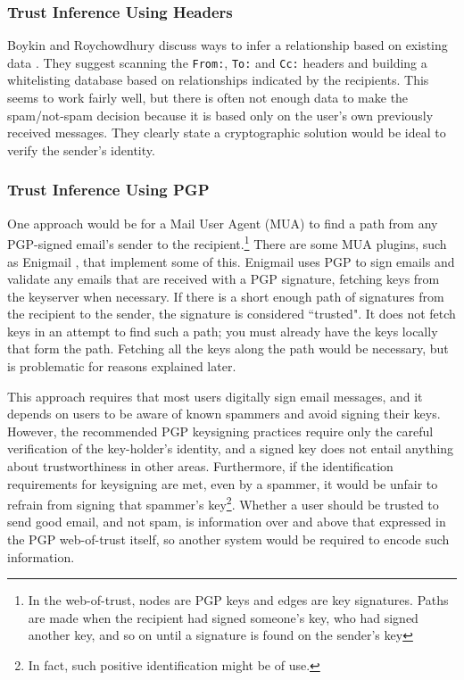 \documentclass[letterpaper]{www2006-submission}
\begin{document}
\subsubsection{Trust Inference Using Headers}
Boykin and Roychowdhury discuss ways to infer a relationship based on existing data \citep{boykin04email}.  They suggest scanning the \texttt{From:}, \texttt{To:} and \texttt{Cc:} headers and building a whitelisting database based on relationships indicated by the recipients.  This seems to work fairly well, but there is often not enough data to make the spam/not-spam decision because it is based only on the user's own previously received messages. They clearly state a cryptographic solution would be ideal to verify the sender's identity.

\subsubsection{Trust Inference Using PGP}
\label{earlierPGP}
One approach would be for a Mail User Agent (MUA) to find a path from any PGP-signed email's sender to the recipient.\footnote{In the web-of-trust, nodes are PGP keys and edges are key signatures.  Paths are made when the recipient had signed someone's key, who had signed another key, and so on until a signature is found on the sender's key}  There are some MUA plugins, such as Enigmail \citep{enigmail}, that implement some of this.  Enigmail uses PGP to sign emails and validate any emails that are received with a PGP signature, fetching keys from the keyserver when necessary.  If there is a short enough path of signatures from the recipient to the sender, the signature is considered ``trusted".  It does not fetch keys in an attempt to find such a path; you must already have the keys locally that form the path.  Fetching all the keys along the path would be necessary, but is problematic for reasons explained later.

This approach requires that most users digitally sign email messages, and it depends on users to be aware of known spammers and avoid signing their keys. However, the recommended PGP keysigning practices require only the careful verification of the key-holder's identity, and a signed key does not entail anything about trustworthiness in other areas.  Furthermore, if the identification requirements for keysigning are met, even by a spammer, it would be unfair to refrain from signing that spammer's key\footnote{In fact, such positive identification might be of use.}.  Whether a user should be trusted to send good email, and not spam, is information over and above that expressed in the PGP web-of-trust itself, so another system would be required to encode such information.
\end{document}

